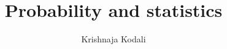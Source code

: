 \documentclass[journal,12pt,twocolumn]{IEEEtran}
\begin{document}
\makeatletter
{}
\makeatother
\let\StandardTheFigure\thefigure
\let\vec\mathbf
\def\putbox#1#2#3{\makebox[0in][l]{\makebox[#1][l]{}\raisebox{\baselineskip}[0in][0in]{\raisebox{#2}[0in][0in]{#3}}}}
     \def\rightbox#1{\makebox[0in][r]{#1}}
     \def\centbox#1{\makebox[0in]{#1}}
     \def\topbox#1{\raisebox{-\baselineskip}[0in][0in]{#1}}
     \def\midbox#1{\raisebox{-0.5\baselineskip}[0in][0in]{#1}}
\vspace{3cm}
\title{Probability and statistics}
\author{Krishnaja Kodali}
%
%
%
% 
%
\end{document}
